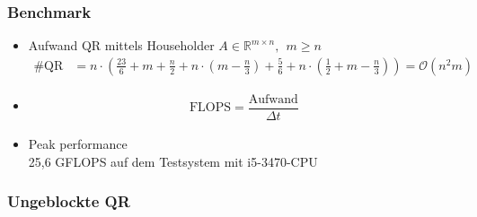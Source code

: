 

\begin{frame}
\frametitle{Benchmark}
	\begin{itemize}
		\item Aufwand QR mittels Householder $A \in \mathbb{R}^{m \times n},~~ m \ge n$
		\begin{align*}
			\#\text{QR} &= n\cdot\left( \frac{23}{6}+m+\frac{n}{2} + n\cdot\left(m-\frac{n}{3}\right) + \frac{5}{6} + n\cdot\left(\frac{1}{2} + m-\frac{n}{3}\right) \right) = \mathcal{O}(n^2m)
		\end{align*}
		\item 
		\begin{align*}
			\text{FLOPS} = \dfrac{\text{Aufwand}}{\Delta t}
		\end{align*}
		\item Peak performance \\
		25,6 GFLOPS auf dem Testsystem mit i5-3470-CPU
	\end{itemize}
\end{frame}

\begin{frame}
	\frametitle{Ungeblockte QR}
	\centering
\end{frame}



